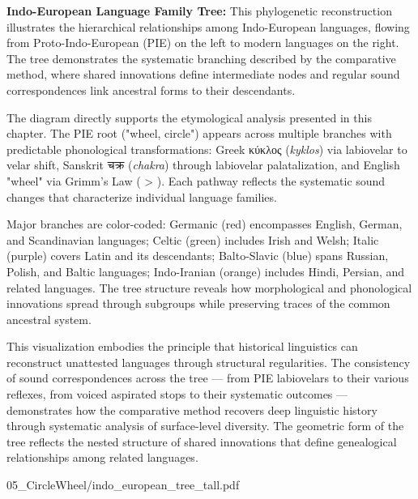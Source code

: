 \begin{SideNotePage}{
  \textbf{Indo-European Language Family Tree:} This phylogenetic reconstruction illustrates the hierarchical relationships among Indo-European languages, flowing from Proto-Indo-European (PIE) on the left to modern languages on the right. The tree demonstrates the systematic branching described by the comparative method, where shared innovations define intermediate nodes and regular sound correspondences link ancestral forms to their descendants.
  
  \vspace{0.5em}
  The diagram directly supports the etymological analysis presented in this chapter. The PIE root  ("wheel, circle") appears across multiple branches with predictable phonological transformations: Greek \textgreek{κύκλος} (\emph{kyklos}) via labiovelar to velar shift, Sanskrit \textsanskrit{चक्र} (\emph{chakra}) through labiovelar palatalization, and English "wheel" via Grimm's Law ( > ). Each pathway reflects the systematic sound changes that characterize individual language families.
  
  \vspace{0.5em}
  Major branches are color-coded: Germanic (red) encompasses English, German, and Scandinavian languages; Celtic (green) includes Irish and Welsh; Italic (purple) covers Latin and its descendants; Balto-Slavic (blue) spans Russian, Polish, and Baltic languages; Indo-Iranian (orange) includes Hindi, Persian, and related languages. The tree structure reveals how morphological and phonological innovations spread through subgroups while preserving traces of the common ancestral system.
  
  \vspace{0.5em}
  This visualization embodies the principle that historical linguistics can reconstruct unattested languages through structural regularities. The consistency of sound correspondences across the tree — from PIE labiovelars to their various reflexes, from voiced aspirated stops to their systematic outcomes — demonstrates how the comparative method recovers deep linguistic history through systematic analysis of surface-level diversity. The geometric form of the tree reflects the nested structure of shared innovations that define genealogical relationships among related languages.
}{05_CircleWheel/indo_european_tree_tall.pdf}
\end{SideNotePage}